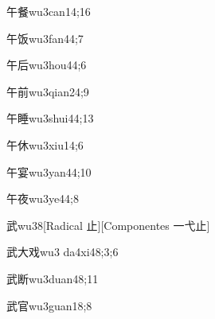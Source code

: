 \begin{verbete}{午餐}{wu3can1}{4;16}
\end{verbete}

\begin{verbete}{午饭}{wu3fan4}{4;7}
\end{verbete}

\begin{verbete}{午后}{wu3hou4}{4;6}
\end{verbete}

\begin{verbete}{午前}{wu3qian2}{4;9}
\end{verbete}

\begin{verbete}{午睡}{wu3shui4}{4;13}
\end{verbete}

\begin{verbete}{午休}{wu3xiu1}{4;6}
\end{verbete}

\begin{verbete}{午宴}{wu3yan4}{4;10}
\end{verbete}

\begin{verbete}{午夜}{wu3ye4}{4;8}
\end{verbete}

\begin{verbete}{武}{wu3}{8}[Radical 止][Componentes 一弋止]
\end{verbete}

\begin{verbete}{武大戏}{wu3 da4xi4}{8;3;6}
\end{verbete}

\begin{verbete}{武断}{wu3duan4}{8;11}
\end{verbete}

\begin{verbete}{武官}{wu3guan1}{8;8}
\end{verbete}


